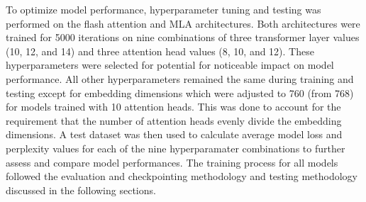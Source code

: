 To optimize model performance, hyperparameter tuning and testing was performed on the flash attention and MLA architectures. 
Both architectures were trained for 5000 iterations on nine combinations of three transformer layer values (10, 12, and 14) and three attention head values (8, 10, and 12). 
These hyperparameters were selected for potential for noticeable impact on model performance.
All other hyperparameters remained the same during training and testing except for embedding dimensions which were adjusted to 760 (from 768) for models trained with 10 attention heads. 
This was done to account for the requirement that the number of attention heads evenly divide the embedding dimensions. A test dataset was then used to calculate average model loss and perplexity values for each of the nine hyperparamater combinations to further assess and compare model performances.
The training process for all models followed the evaluation and checkpointing methodology and testing methodology discussed in the following sections. 


